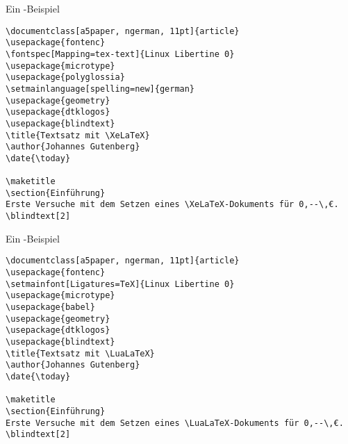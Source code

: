 \begin{frame}[fragile]{Ein \XeLaTeX{}-Beispiel}
\begin{lstlisting}[style=tex]
%% Ein xelatex-Beispiel
\documentclass[a5paper, ngerman, 11pt]{article}
\usepackage{fontenc}
\fontspec[Mapping=tex-text]{Linux Libertine 0}
\usepackage{microtype}
\usepackage{polyglossia}
\setmainlanguage[spelling=new]{german}
\usepackage{geometry}
\usepackage{dtklogos}
\usepackage{blindtext}
\title{Textsatz mit \XeLaTeX}
\author{Johannes Gutenberg}
\date{\today}

\maketitle
\section{Einführung}
Erste Versuche mit dem Setzen eines \XeLaTeX-Dokuments für 0,--\,€.
\blindtext[2]

\end{lstlisting}
\end{frame}

\begin{frame}[fragile]{Ein \LuaLaTeX{}-Beispiel}
\begin{lstlisting}[style=tex]
%% Ein lualatex-Beispiel
\documentclass[a5paper, ngerman, 11pt]{article}
\usepackage{fontenc}
\setmainfont[Ligatures=TeX]{Linux Libertine 0}
\usepackage{microtype}
\usepackage{babel}
\usepackage{geometry}
\usepackage{dtklogos}
\usepackage{blindtext}
\title{Textsatz mit \LuaLaTeX}
\author{Johannes Gutenberg}
\date{\today}

\maketitle
\section{Einführung}
Erste Versuche mit dem Setzen eines \LuaLaTeX-Dokuments für 0,--\,€.
\blindtext[2]

\end{lstlisting}
\end{frame}